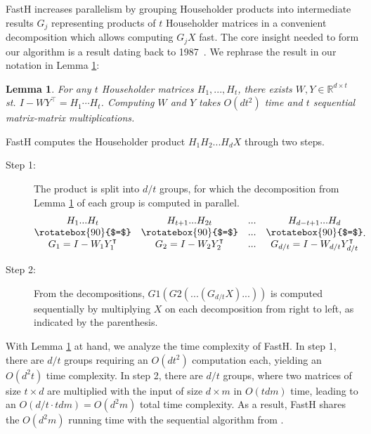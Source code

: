 \documentclass[11pt,a4paper,twoside,openright,final]{memoir}
\newtheorem{lemma}{Lemma}
\begin{document}
FastH increases parallelism by grouping Householder products into intermediate results $G_j$ representing products of $t$ Householder matrices in a convenient decomposition which allows computing $G_jX$ fast. 
The core insight needed to form our algorithm is a result dating back to 1987~\cite{wydec}.
We rephrase the result in our notation in Lemma \ref{lem:wydec}:

\begin{lemma}\label{lem:wydec}
For any $t$ Householder matrices $H_1,...,H_t$, there exists $W,Y\in \mathbb{R}^{d\times t}$ st. 
$I-WY^\intercal = H_1 \cdots H_t$. 
Computing $W$ and $Y$ takes $O(dt^2)$ time and $t$ sequential matrix-matrix multiplications. 
\end{lemma}

FastH computes the Householder product $H_1H_2...H_dX$ through two steps.

\begin{description}
	\item[Step 1:] The product is split into $d/t$ groups, for which the decomposition from Lemma \ref{lem:wydec} of each group is computed in parallel.
\newcommand{\veq}{\mathrel{\rotatebox{90}{$=$}}}
\begin{equation}
    \begin{matrix}
        H_1...H_t & H_{t+1}...H_{2t} & ... & H_{d-t+1}...H_d \\
        \veq  & \veq & ... & \veq\\
        G_1 = I -W_1Y_1^\intercal & G_2 = I - W_2Y_2^\intercal & ... & G_{d/t} = I - W_{d/t}Y_{d/t}^\intercal
    \end{matrix}.
\end{equation}
\item[Step 2:] From the decompositions, $G1(G2(...(G_{d/t}X)...))$ is computed sequentially by multiplying $X$ on each decomposition from right to left, as indicated by the parenthesis.
\end{description}

With Lemma \ref{lem:wydec} at hand, we analyze the time complexity of FastH.
In step 1, there are $d/t$ groups requiring an $O(dt^2)$ computation each, yielding an $O(d^2t)$ time complexity.
In step 2, there are $d/t$ groups, where two matrices of size $t\times d$ are multiplied with the input of size $d \times m$ in $O(tdm)$ time, leading to an $O(d/t \cdot tdm) = O(d^2m)$ total time complexity.
As a result, FastH shares the $O(d^2m)$ running time with the sequential algorithm from \cite{sequential}.
\end{document}
